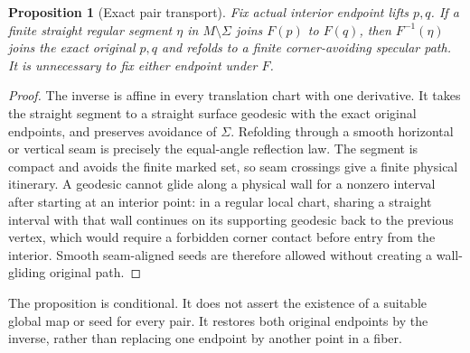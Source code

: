 \documentclass[11pt]{article}
\newtheorem{proposition}[theorem]{Proposition}
\theoremstyle{definition}
\begin{document}
\begin{proposition}[Exact pair transport]\label{prop:transport}
Fix actual interior endpoint lifts $p,q$. If a finite straight regular segment $\eta$ in $M\setminus\Sigma$ joins $F(p)$ to $F(q)$, then $F^{-1}(\eta)$ joins the exact original $p,q$ and refolds to a finite corner-avoiding specular path. It is unnecessary to fix either endpoint under $F$.
\end{proposition}
\begin{proof}
The inverse is affine in every translation chart with one derivative. It takes the straight segment to a straight surface geodesic with the exact original endpoints, and preserves avoidance of $\Sigma$. Refolding through a smooth horizontal or vertical seam is precisely the equal-angle reflection law. The segment is compact and avoids the finite marked set, so seam crossings give a finite physical itinerary. A geodesic cannot glide along a physical wall for a nonzero interval after starting at an interior point: in a regular local chart, sharing a straight interval with that wall continues on its supporting geodesic back to the previous vertex, which would require a forbidden corner contact before entry from the interior. Smooth seam-aligned seeds are therefore allowed without creating a wall-gliding original path.
\end{proof}

The proposition is conditional. It does not assert the existence of a suitable global map or seed for every pair. It restores both original endpoints by the inverse, rather than replacing one endpoint by another point in a fiber.
\end{document}
